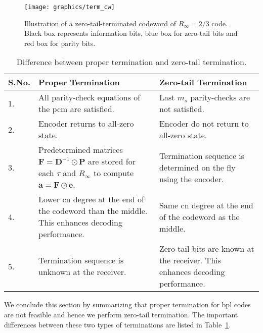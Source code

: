 \begin{figure}[htbp]
  \centering
  \texttt{[image: graphics/term\_cw]}
  \caption{Illustration of a zero-tail-terminated codeword of $R_\infty=2/3$ code. Black box represents information bits, blue box for zero-tail bits and red box for parity bits.}
  \label{fig:term_cw}
\end{figure}

\begin{table}[htbp]
  \centering
  \begin{tabular}{|l|p{7cm}|p{7cm}|}
    \hline
    \textbf{S.No.} &\textbf{Proper Termination} &\textbf{Zero-tail Termination}\\
    \hline
    \hline
    1. &All parity-check equations of the \ac{pcm} are satisfied. &Last $m_s$ parity-checks are not satisfied.\\
    \hline
    2. &Encoder returns to all-zero state. &Encoder do not return to all-zero state.\\
    \hline
    3. &Predetermined matrices $\mathbf{F}=\mathbf{D}^{-1}\odot\mathbf{P}$ are stored for each $\tau$ and $R_\infty$ to compute $\mathbf{a}=\mathbf{F}\odot\mathbf{e}$. &Termination sequence is determined on the fly using the encoder.\\
    \hline
    4. &Lower \ac{cn} degree at the end of the codeword than the middle. This enhances decoding performance. &Same \ac{cn} degree at the end of the codeword as the middle.\\
    \hline
    5. &Termination sequence is unknown at the receiver. &Zero-tail bits are known at the receiver. This enhances decoding performance.\\
    \hline
  \end{tabular}
  \caption{Difference between proper termination and zero-tail termination.}
  \label{tab:diff_term}
\end{table}

We conclude this section by summarizing that proper termination for \ac{bpl} codes are not feasible and hence we perform zero-tail termination. The important differences between these two types of terminations are listed in Table~\ref{tab:diff_term}.